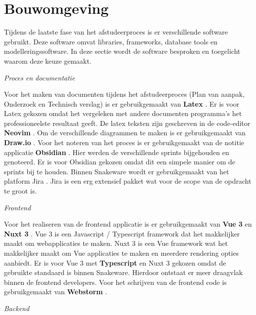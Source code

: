 \section{Bouwomgeving}
\label{section:Bouwomgeving}
Tijdens de laatste fase van het afstudeerproces is er verschillende software gebruikt.
Deze software omvat libraries, frameworks, database tools en modelleringssoftware.
In deze sectie wordt de software besproken en toegelicht waarom deze keuze gemaakt.

\whitespace[2]
\textit{Proces en documentatie}

\whitespace[2]
Voor het maken van documenten tijdens het afstudeerproces (Plan van aanpak, Onderzoek en Technisch verslag) is er gebruikgemaakt van \textbf{Latex} \parencite{Latex}.
Er is voor Latex gekozen omdat het vergeleken met andere documenten programma's het professioneelste resultaat geeft.
De latex teksten zijn geschreven in de code-editor \textbf{Neovim} \parencite{NeoVim}.
Om de verschillende diagrammen te maken is er gebruikgemaakt van \textbf{Draw.io} \parencite{Drawio}.
Voor het noteren van het proces is er gebruikgemaakt van de notitie applicatie \textbf{Obsidian} \parencite{Obsidian}.
Hier werden de verschillende sprints bijgehouden en genoteerd.
Er is voor Obsidian gekozen omdat dit een simpele manier om de sprints bij te houden.
Binnen Snakeware wordt er gebruikgemaakt van het platform Jira \parencite{Jira}.
Jira is een erg extensief pakket wat voor de scope van de opdracht te groot is.

\whitespace[2]
\textit{Frontend}

\whitespace[2]
Voor het realiseren van de frontend applicatie is er gebruikgemaakt van \textbf{Vue 3} \parencite{Vue} en \textbf{Nuxt 3} \parencite{Nuxt}.
Vue 3 is een Javascript \parencite{JavaScript} / Typescript \parencite{Typescript} framework dat het makkelijker maakt om webapplicaties te maken.
Nuxt 3 is een Vue framework wat het makkelijker maakt om Vue applicaties te maken en meerdere rendering opties aanbiedt.
Er is voor Vue 3 met \textbf{Typescript} en Nuxt 3 gekozen omdat de gebruikte standaard is binnen Snakeware.
Hierdoor ontstaat er meer draagvlak binnen de frontend developers.
Voor het schrijven van de frontend code is gebruikgemaakt van \textbf{Webstorm} \parencite{Webstorm}.

\newpage

\whitespace[2]
\textit{Backend}

